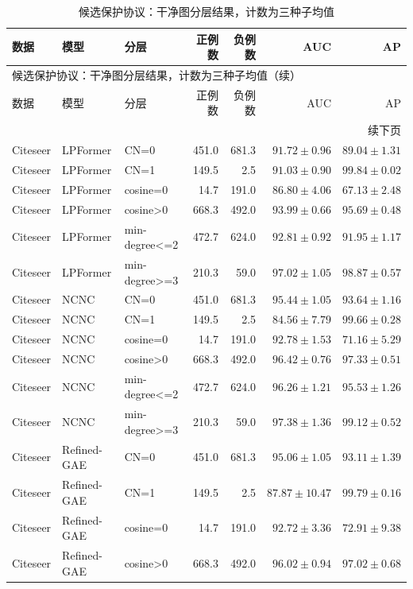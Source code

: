{\footnotesize
\setlength{\tabcolsep}{3.2pt}
\renewcommand{\arraystretch}{1.10}
\begin{longtable}{lllrrrr}
\caption{候选保护协议：干净图分层结果，计数为三种子均值}\\
\toprule
数据 & 模型 & 分层 & 正例数 & 负例数 & AUC & AP \\
\midrule
\endfirsthead
\multicolumn{7}{l}{候选保护协议：干净图分层结果，计数为三种子均值（续）}\\
\toprule
数据 & 模型 & 分层 & 正例数 & 负例数 & AUC & AP \\
\midrule
\endhead
\midrule\multicolumn{7}{r}{续下页}\\
\endfoot
\bottomrule
\endlastfoot
Citeseer & LPFormer & CN=0 & 451.0 & 681.3 & $91.72\pm0.96$ & $89.04\pm1.31$ \\
Citeseer & LPFormer & CN=1 & 149.5 & 2.5 & $91.03\pm0.90$ & $99.84\pm0.02$ \\
Citeseer & LPFormer & cosine=0 & 14.7 & 191.0 & $86.80\pm4.06$ & $67.13\pm2.48$ \\
Citeseer & LPFormer & cosine>0 & 668.3 & 492.0 & $93.99\pm0.66$ & $95.69\pm0.48$ \\
Citeseer & LPFormer & min-degree<=2 & 472.7 & 624.0 & $92.81\pm0.92$ & $91.95\pm1.17$ \\
Citeseer & LPFormer & min-degree>=3 & 210.3 & 59.0 & $97.02\pm1.05$ & $98.87\pm0.57$ \\
Citeseer & NCNC & CN=0 & 451.0 & 681.3 & $95.44\pm1.05$ & $93.64\pm1.16$ \\
Citeseer & NCNC & CN=1 & 149.5 & 2.5 & $84.56\pm7.79$ & $99.66\pm0.28$ \\
Citeseer & NCNC & cosine=0 & 14.7 & 191.0 & $92.78\pm1.53$ & $71.16\pm5.29$ \\
Citeseer & NCNC & cosine>0 & 668.3 & 492.0 & $96.42\pm0.76$ & $97.33\pm0.51$ \\
Citeseer & NCNC & min-degree<=2 & 472.7 & 624.0 & $96.26\pm1.21$ & $95.53\pm1.26$ \\
Citeseer & NCNC & min-degree>=3 & 210.3 & 59.0 & $97.38\pm1.36$ & $99.12\pm0.52$ \\
Citeseer & Refined-GAE & CN=0 & 451.0 & 681.3 & $95.06\pm1.05$ & $93.11\pm1.39$ \\
Citeseer & Refined-GAE & CN=1 & 149.5 & 2.5 & $87.87\pm10.47$ & $99.79\pm0.16$ \\
Citeseer & Refined-GAE & cosine=0 & 14.7 & 191.0 & $92.72\pm3.36$ & $72.91\pm9.38$ \\
Citeseer & Refined-GAE & cosine>0 & 668.3 & 492.0 & $96.02\pm0.94$ & $97.02\pm0.68$ \\

\end{longtable}}
